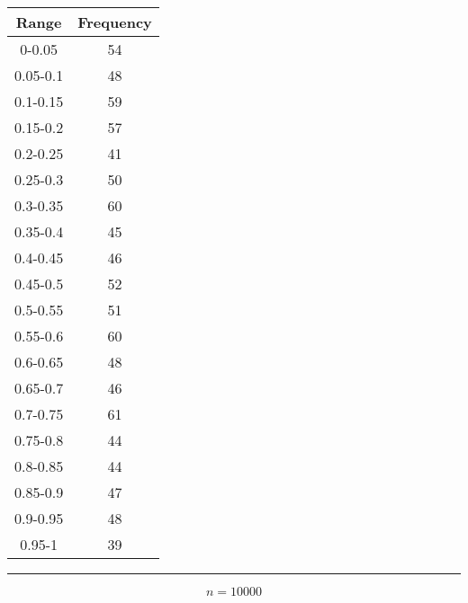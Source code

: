 \documentclass{article}
\begin{document}
\begin{center} \begin{tabular}{||c | c||}  \hline
		Range & Frequency \\ [0.5ex] \hline \hline0-0.05 & 54\\
		\hline 
		0.05-0.1 & 48\\
		\hline 
		0.1-0.15 & 59\\
		\hline 
		0.15-0.2 & 57\\
		\hline 
		0.2-0.25 & 41\\
		\hline 
		0.25-0.3 & 50\\
		\hline 
		0.3-0.35 & 60\\
		\hline 
		0.35-0.4 & 45\\
		\hline 
		0.4-0.45 & 46\\
		\hline 
		0.45-0.5 & 52\\
		\hline 
		0.5-0.55 & 51\\
		\hline 
		0.55-0.6 & 60\\
		\hline 
		0.6-0.65 & 48\\
		\hline 
		0.65-0.7 & 46\\
		\hline 
		0.7-0.75 & 61\\
		\hline 
		0.75-0.8 & 44\\
		\hline 
		0.8-0.85 & 44\\
		\hline 
		0.85-0.9 & 47\\
		\hline 
		0.9-0.95 & 48\\
		\hline 
		0.95-1 & 39\\
		\hline 
	\end{tabular} 
\end{center}

\pagebreak

\begin {figure}
\begin{center}
	
\end{center}
\end {figure}
\noindent\rule[0.5ex]{\linewidth}{1pt}


$$n= 10000$$
\end{document}
